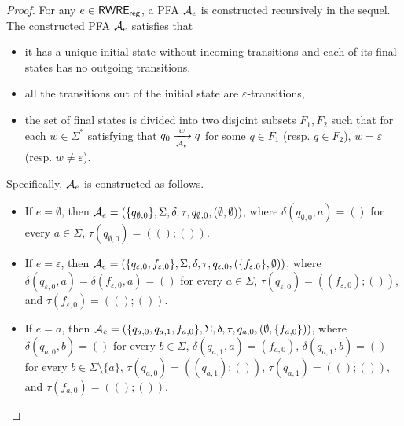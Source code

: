 \begin{proof}
    For any $e \in {\sf RWRE_{reg}}$, a PFA $\mathcal{A}_e$ is constructed recursively in the sequel. The constructed PFA $\mathcal{A}_e$ satisfies that 
    \begin{itemize}
        \item it has a unique initial state without incoming transitions and each of its final states has no outgoing transitions,
        \item all the transitions out of the initial state are $\varepsilon$-transitions, 
        \item the set of final states is divided into two disjoint subsets $F_1, F_2$ such that for each $w \in \Sigma^*$ satisfying that $q_0 \xrightarrow[\mathcal{A}_e]{w} q$ for some $q \in F_1$ (resp. $q \in F_2$), $w = \varepsilon$ (resp. $w \neq \varepsilon$).
    \end{itemize}
    Specifically, $\mathcal{A}_e$ is constructed as follows.
    \begin{itemize}
        \item If $e =\emptyset$, then $\mathcal{A}_e = (\{q_{\emptyset, 0}\}, \Sigma, \delta, \tau, q_{\emptyset, 0}, (\emptyset, \emptyset))$, where $\delta(q_{\emptyset, 0}, a) = ()$ for every $a \in \Sigma$, $\tau(q_{\emptyset, 0}) = ((); ())$.

        \item If $e = \varepsilon$, then  $\mathcal{A}_e = (\{q_{\varepsilon, 0}, f_{\varepsilon,0}\}, \Sigma, \delta, \tau, q_{\varepsilon,0}, (\{f_{\varepsilon,0}\}, \emptyset))$, where  $\delta(q_{\varepsilon,0}, a) = \delta(f_{\varepsilon,0}, a) = ()$ for every $a \in \Sigma$, $\tau(q_{\varepsilon,0}) = ((f_{\varepsilon,0}); ())$, and $\tau(f_{\varepsilon,0}) = ((); ())$. 

        \item If $e = a$, then $\mathcal{A}_e = (\{q_{a,0}, q_{a,1}, f_{a,0}\}, \Sigma, \delta, \tau, q_{a,0}, (\emptyset, \{f_{a,0}\}))$, where $\delta(q_{a,0}, b) = ()$ for every $b \in \Sigma$, $\delta(q_{a,1}, a) = (f_{a,0})$, $\delta(q_{a,1}, b) = ()$ for every $b \in \Sigma \setminus \{a\}$, $\tau(q_{a,0}) = ((q_{a,1}); ())$, $\tau(q_{a,1}) = ((); ())$, and $\tau(f_{a,0}) = ((); ())$.


\end{itemize}
\end{proof}
